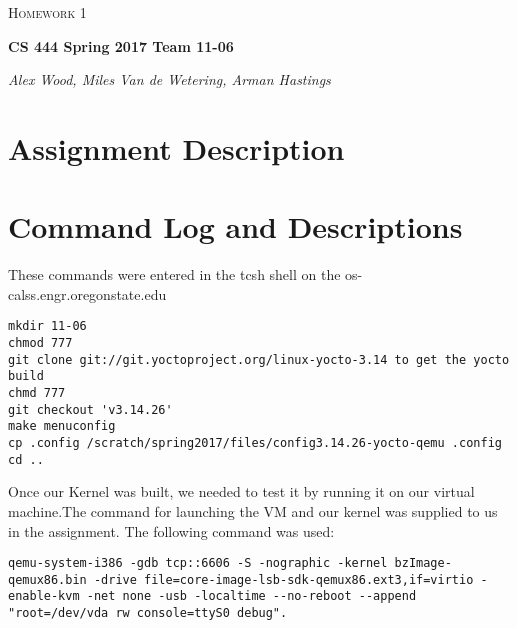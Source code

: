 \documentclass[letterpaper,10pt,draftclsnofoot,onecolumn]{IEEEtran}
\def\name{Alex Wood, Miles Van de Wetering, Arman Hastings}
\begin{document}
\begin{titlepage}
   \centering
	{\scshape\Large Homework 1\par}
	\vspace{1.5cm}
	{\huge\bfseries CS 444 Spring 2017 Team 11-06\par}
	\vspace{2cm}
	{\Large\itshape \name \par}
    
    \date{\today}
    
    \vspace{2cm}
    
    \begin{abstract}
 	This is the first group assignment of CS 344. We have started the project, but need to complete before abstract can be finished. 
   \end{abstract}
      
\end{titlepage}

\tableofcontents

\section{Assignment Description}

\section{Command Log and Descriptions}
These commands were entered in the tcsh shell on the os-calss.engr.oregonstate.edu

\begin{lstlisting}
mkdir 11-06
chmod 777
git clone git://git.yoctoproject.org/linux-yocto-3.14 to get the yocto build
chmd 777
git checkout 'v3.14.26'
make menuconfig
cp .config /scratch/spring2017/files/config3.14.26-yocto-qemu .config
cd ..
\end{lstlisting}
Once our Kernel was built, we needed to test it by running it on our virtual machine.The command for launching the VM and our kernel was supplied to us in the assignment. The following command was used:  
\begin{lstlisting}
qemu-system-i386 -gdb tcp::6606 -S -nographic -kernel bzImage-qemux86.bin -drive file=core-image-lsb-sdk-qemux86.ext3,if=virtio -enable-kvm -net none -usb -localtime --no-reboot --append "root=/dev/vda rw console=ttyS0 debug".

\end{lstlisting}
\end{document}
